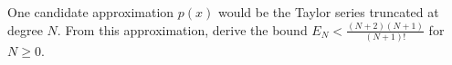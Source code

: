 One candidate approximation $p(x)$ would be the Taylor series truncated at degree $N$. From this approximation, derive
the bound $E_N < \frac{(N+2)(N+1)}{(N+1)!}$ for $N \ge 0$.

\begin{solution}
  \ \\
  \vfill
\end{solution}